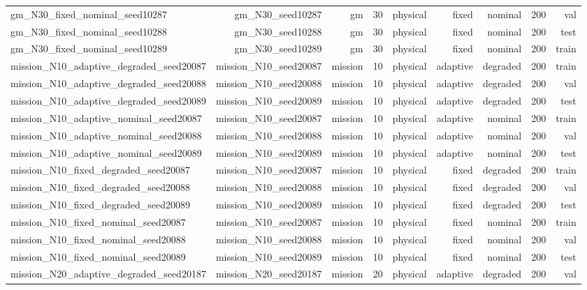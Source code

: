 \begin{tabular}{lrrrrrrrr}
gm\_N30\_fixed\_nominal\_seed10287 & gm\_N30\_seed10287 & gm & 30 & physical & fixed & nominal & 200 & val \\
gm\_N30\_fixed\_nominal\_seed10288 & gm\_N30\_seed10288 & gm & 30 & physical & fixed & nominal & 200 & test \\
gm\_N30\_fixed\_nominal\_seed10289 & gm\_N30\_seed10289 & gm & 30 & physical & fixed & nominal & 200 & train \\
mission\_N10\_adaptive\_degraded\_seed20087 & mission\_N10\_seed20087 & mission & 10 & physical & adaptive & degraded & 200 & train \\
mission\_N10\_adaptive\_degraded\_seed20088 & mission\_N10\_seed20088 & mission & 10 & physical & adaptive & degraded & 200 & val \\
mission\_N10\_adaptive\_degraded\_seed20089 & mission\_N10\_seed20089 & mission & 10 & physical & adaptive & degraded & 200 & test \\
mission\_N10\_adaptive\_nominal\_seed20087 & mission\_N10\_seed20087 & mission & 10 & physical & adaptive & nominal & 200 & train \\
mission\_N10\_adaptive\_nominal\_seed20088 & mission\_N10\_seed20088 & mission & 10 & physical & adaptive & nominal & 200 & val \\
mission\_N10\_adaptive\_nominal\_seed20089 & mission\_N10\_seed20089 & mission & 10 & physical & adaptive & nominal & 200 & test \\
mission\_N10\_fixed\_degraded\_seed20087 & mission\_N10\_seed20087 & mission & 10 & physical & fixed & degraded & 200 & train \\
mission\_N10\_fixed\_degraded\_seed20088 & mission\_N10\_seed20088 & mission & 10 & physical & fixed & degraded & 200 & val \\
mission\_N10\_fixed\_degraded\_seed20089 & mission\_N10\_seed20089 & mission & 10 & physical & fixed & degraded & 200 & test \\
mission\_N10\_fixed\_nominal\_seed20087 & mission\_N10\_seed20087 & mission & 10 & physical & fixed & nominal & 200 & train \\
mission\_N10\_fixed\_nominal\_seed20088 & mission\_N10\_seed20088 & mission & 10 & physical & fixed & nominal & 200 & val \\
mission\_N10\_fixed\_nominal\_seed20089 & mission\_N10\_seed20089 & mission & 10 & physical & fixed & nominal & 200 & test \\
mission\_N20\_adaptive\_degraded\_seed20187 & mission\_N20\_seed20187 & mission & 20 & physical & adaptive & degraded & 200 & val \\

\end{tabular}
